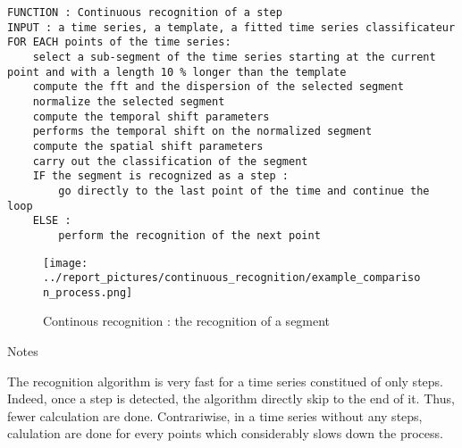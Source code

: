 \documentclass[11pt, sans]{beamer}
\begin{document}
\begin{frame}[fragile]

\begin{overprint}

\begin{lstlisting}
FUNCTION : Continuous recognition of a step
INPUT : a time series, a template, a fitted time series classificateur
FOR EACH points of the time series:
	select a sub-segment of the time series starting at the current point and with a length 10 % longer than the template
	compute the fft and the dispersion of the selected segment
	normalize the selected segment
	compute the temporal shift parameters
	performs the temporal shift on the normalized segment
	compute the spatial shift parameters
	carry out the classification of the segment 
	IF the segment is recognized as a step :
		go directly to the last point of the time and continue the loop
	ELSE :
		perform the recognition of the next point
\end{lstlisting}


\begin{figure}[H]
	\texttt{[image: ../report\_pictures/continuous\_recognition/example\_comparison\_process.png]}
	\caption{Continous recognition : the recognition of a segment}
	\label{example_comparison_process}
\end{figure}


\begin{exampleblock}{Notes}

The recognition algorithm is very fast for a time series constitued of only steps. Indeed, once a step is detected, the algorithm directly skip to the end of it. Thus, fewer calculation are done. Contrariwise, in a time series without any steps, calulation are done for every points which considerably slows down the process.

\end{exampleblock}

\end{overprint}

\end{frame}
\end{document}
